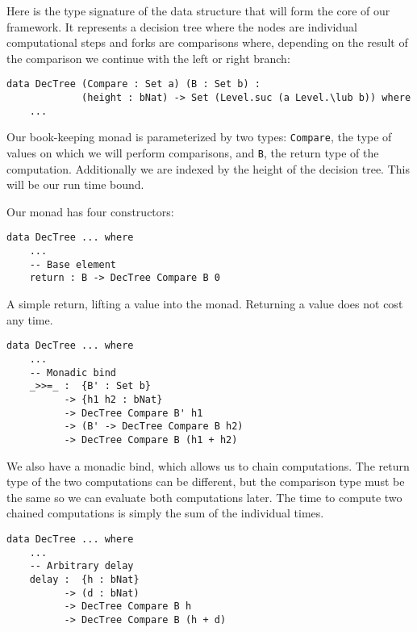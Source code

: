 Here is the type signature of the data structure that will form the core of our framework. It represents a decision tree where the nodes are individual computational steps and forks are comparisons where, depending on the result of the comparison we continue with the left or right branch:

\begin{lstlisting}[caption={The DecTree Monad},label={lst:dectree:1},emph={DecTree,Set,Level}]
data DecTree (Compare : Set a) (B : Set b) :
             (height : bNat) -> Set (Level.suc (a Level.\lub b)) where
    ...
\end{lstlisting}

Our book-keeping monad is parameterized by two types: \texttt{Compare}, the type of values on which we will perform comparisons, and \texttt{B}, the return type of the computation. Additionally we are indexed by the height of the decision tree. This will be our run time bound.

Our monad has four constructors:

\begin{lstlisting}[caption={The DecTree Monad},label={lst:dectree:2},emph={DecTree,return}]
data DecTree ... where
    ...
    -- Base element
    return : B -> DecTree Compare B 0
\end{lstlisting}

A simple return, lifting a value into the monad. Returning a value does not cost any time.

\begin{lstlisting}[caption={The DecTree Monad},label={lst:dectree:3},emph={DecTree}]
data DecTree ... where
    ...
    -- Monadic bind
    _>>=_ :  {B' : Set b}
          -> {h1 h2 : bNat}
          -> DecTree Compare B' h1
          -> (B' -> DecTree Compare B h2)
          -> DecTree Compare B (h1 + h2)
\end{lstlisting}

We also have a monadic bind, which allows us to chain computations. The return type of the two computations can be different, but the comparison type must be the same so we can evaluate both computations later. The time to compute two chained computations is simply the sum of the individual times.

\begin{lstlisting}[caption={The DecTree Monad},label={lst:dectree:4},emph={DecTree,delay}]
data DecTree ... where
    ...
    -- Arbitrary delay
    delay :  {h : bNat}
          -> (d : bNat)
          -> DecTree Compare B h
          -> DecTree Compare B (h + d)
\end{lstlisting}

